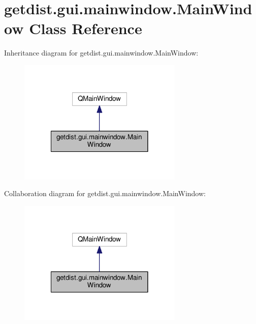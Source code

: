 \hypertarget{classgetdist_1_1gui_1_1mainwindow_1_1MainWindow}{}\section{getdist.\+gui.\+mainwindow.\+Main\+Window Class Reference}
\label{classgetdist_1_1gui_1_1mainwindow_1_1MainWindow}


Inheritance diagram for getdist.\+gui.\+mainwindow.\+Main\+Window\+:
\nopagebreak
\begin{figure}[H]
\begin{center}
\leavevmode
\includegraphics[width=222pt]{classgetdist_1_1gui_1_1mainwindow_1_1MainWindow__inherit__graph}
\end{center}
\end{figure}


Collaboration diagram for getdist.\+gui.\+mainwindow.\+Main\+Window\+:
\nopagebreak
\begin{figure}[H]
\begin{center}
\leavevmode
\includegraphics[width=222pt]{classgetdist_1_1gui_1_1mainwindow_1_1MainWindow__coll__graph}
\end{center}
\end{figure}
